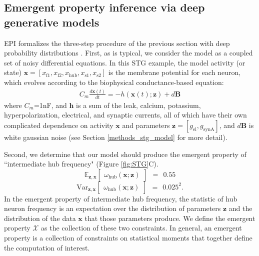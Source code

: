 \documentclass[11pt]{article}
\begin{document}
\subsection{Emergent property inference via deep generative models} \label{results_dgm}
EPI formalizes the three-step procedure of the previous section with deep probability distributions \cite{rezende2015variational, papamakarios2019normalizing}.
First, as is typical, we consider the model as a coupled set of noisy differential equations.  
In this STG example, the model activity (or state) $\mathbf{x} = \left[ x_{\text{f1}}, x_{\text{f2}}, x_{\text{hub}}, x_{\text{s1}}, x_{\text{s2}} \right]$ is the membrane potential for each neuron, which evolves according to the biophysical conductance-based equation:
\begin{equation} \label{eq:STG_model1}
\begin{split}
C_m \frac{d\mathbf{x}(t)}{dt} = -h(\mathbf{x}(t); \mathbf{z}) + d\mathbf{B}
 \end{split}
\end{equation} 
where $C_m$=1nF, and $\mathbf{h}$ is a sum of the leak, calcium, potassium, hyperpolarization, electrical, and synaptic currents, all of which have their own complicated dependence on activity $\mathbf{x}$ and parameters $\mathbf{z} = [g_{\text{el}}, g_{\text{synA}}]$, and $d\mathbf{B}$ is white gaussian noise \cite{gutierrez2013multiple} (see Section \ref{methods_stg_model} for more detail).

Second, we determine that our model should produce the emergent property of ``intermediate hub frequency" (Figure \ref{fig:STG}C).
\begin{equation}\label{eq:EP_STG1}
 \mathbb{E}_{\mathbf{z},\mathbf{x}}\begin{bmatrix} \omega_{\text{hub}}(\mathbf{x}; \mathbf{z}) \end{bmatrix}  ~~=~~  0.55
\end{equation}
\begin{equation}\label{eq:EP_STG2}
\text{Var}_{\mathbf{z},\mathbf{x}}\begin{bmatrix} \omega_{\text{hub}}(\mathbf{x}; \mathbf{z}) \end{bmatrix}  ~~=~~   0.025^2.
\end{equation}
In the emergent property of intermediate hub frequency, the statistic of hub neuron frequency is an expectation over the distribution of parameters $\mathbf{z}$ and the distribution of the data $\mathbf{x}$ that those parameters produce.
We define the emergent property $\mathcal{X}$ as the collection of these two constraints.
In general, an emergent property is a collection of constraints on statistical moments that together define the computation of interest.
\end{document}
